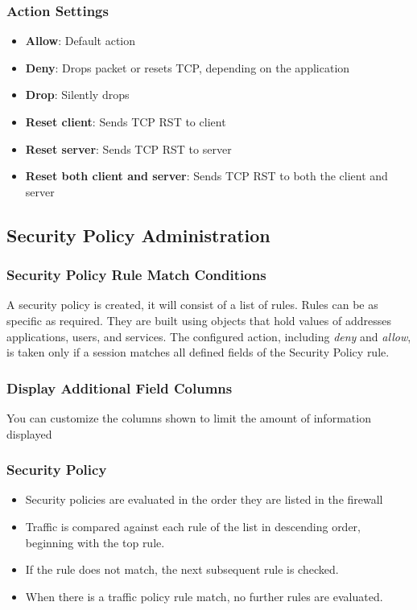\subsubsection{Action Settings}
    \begin{itemize}
        \item \textbf{Allow}:  Default action
        \item \textbf{Deny}:  Drops packet or resets TCP, depending on the application
        \item \textbf{Drop}:  Silently drops
        \item \textbf{Reset client}:  Sends TCP RST to client
        \item \textbf{Reset server}:  Sends TCP RST to server
        \item \textbf{Reset both client and server}:  Sends TCP RST to both the client and server
    \end{itemize}
\subsection{Security Policy Administration}
\subsubsection{Security Policy Rule Match Conditions}
A security policy is created, it will consist of a list of rules. Rules can be as specific as required. They are built using objects that hold values of addresses applications, users, and services. The configured action, including \textit{deny} and \textit{allow}, is taken only if a session matches all defined fields of the Security Policy rule. 

\subsubsection{Display Additional Field Columns}
You can customize the columns shown to limit the amount of information displayed

\subsubsection{Security Policy}
    \begin{itemize}
        \item Security policies are evaluated in the order they are listed in the firewall
        \item Traffic is compared against each rule of the list in descending order, beginning with the top rule.
        \item If the rule does not match, the next subsequent rule is checked.
        \item When there is a traffic policy rule match, no further rules are evaluated.
    \end{itemize}
    
